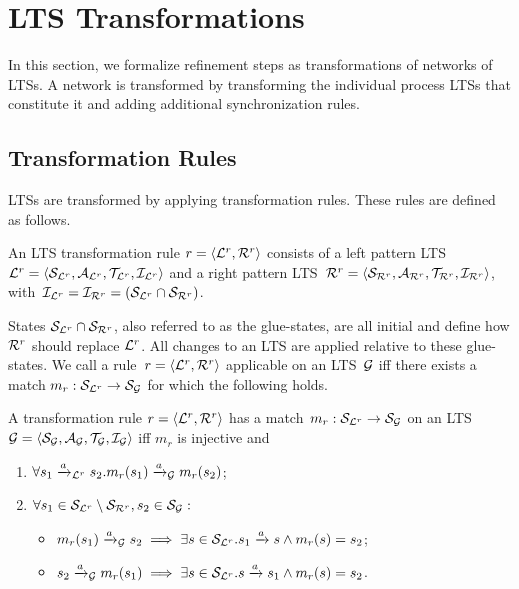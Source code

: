 \section{LTS Transformations}
\label{sec:lts-transformation:transformations}

In this section, we formalize refinement steps as transformations of networks of LTSs.
A network is transformed by transforming the individual process LTSs that constitute it and adding additional synchronization rules.

\subsection{Transformation Rules}
LTSs are transformed by applying transformation rules.
These rules are defined as follows.

\begin{definition}
\label{def:lts-transformation:transformationrule}
An LTS transformation rule $r = \langle \mathcal{L}^{r}, \mathcal{R}^{r} \rangle$ consists of a left pattern LTS~$\mathcal{L}^r = \langle {\mathcal{S}_{\ensuremath{\mathcal{L}}^r}}, {\mathcal{A}_{\mathcal{L}^r}}, {\mathcal{T}_{\mathcal{L}^r}}, \mathcal{I}_{\mathcal{L}^r} \rangle$ and a right pattern LTS~$\mathcal{R}^r = \langle {\mathcal{S}_{\ensuremath{\mathcal{R}}^r}}, {\mathcal{A}_{\mathcal{R}^r}}, {\mathcal{T}_{\mathcal{R}^r}}, \mathcal{I}_{\mathcal{R}^r} \rangle$, with~$\mathcal{I}_{\mathcal{L}^r} = \mathcal{I}_{\mathcal{R}^r} = ({\mathcal{S}_{\mathcal{L}^r}} \cap {\mathcal{S}_{\ensuremath{\mathcal{R}}^r}})$.
\end{definition}

States ${\mathcal{S}_{\mathcal{L}^r}} \cap {\mathcal{S}_{\ensuremath{\mathcal{R}}^r}}$, also referred to as the glue-states, are all initial and define how $\mathcal{R}^r$ should replace $\mathcal{L}^r$.
All changes to an LTS are applied relative to these glue-states.
We call a rule~$r = \langle \mathcal{L}^{r}, \mathcal{R}^{r} \rangle$ applicable on an LTS~$\mathcal{G}$ iff there exists a match $m_r:{\mathcal{S}_{\mathcal{L}^r}} \to {\mathcal{S}_{\ensuremath{\mathcal{G}}}}$ for which the following holds.

\clearpage

\begin{definition}
\label{def:lts-transformation:transmatch}
A transformation rule $r = \langle \mathcal{L}^r, \mathcal{R}^r \rangle$ has a match~$m_r: {\mathcal{S}_{\mathcal{L}^r}} \to {\mathcal{S}_{\ensuremath{\mathcal{G}}}}$ on an LTS~$\mathcal{G} = \langle {\mathcal{S}_{\ensuremath{\mathcal{G}}}}, {\mathcal{A}_{\mathcal{G}}}, {\mathcal{T}_{\mathcal{G}}}, \mathcal{I}_{\mathcal{G}} \rangle$ iff $m_r$ is injective and
\begin{enumerate}
\item $\forall s_1\xrightarrow{a}_{\mathcal{L}^r} s_2. m_r(s_1)\xrightarrow{a}_\mathcal{G} m_r(s_2)$;
\item $\forall s_1 \in {\mathcal{S}_{\ensuremath{\mathcal{L}}^r}} \setminus {\mathcal{S}_{\ensuremath{\mathcal{R}}^r}}, s_2 \in {\mathcal{S}_{\ensuremath{\mathcal{G}}}}:$
	\begin{itemize}
 	\item $m_r(s_1) \xrightarrow{a}_\mathcal{G} s_2 \implies \exists s \in {\mathcal{S}_{\ensuremath{\mathcal{L}}^r}}. s_1\xrightarrow{a} s \wedge m_r(s) = s_2$;
 	\item $s_2 \xrightarrow{a}_\mathcal{G} m_r(s_1) \implies \exists s \in {\mathcal{S}_{\ensuremath{\mathcal{L}}^r}}. s\xrightarrow{a} s_1 \wedge m_r(s) = s_2$.
	\end{itemize}
\end{enumerate}
\end{definition}

